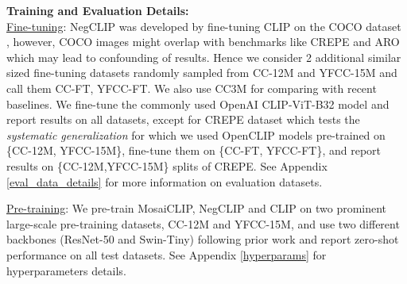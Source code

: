 \documentclass[11pt]{article}
\newcommand{\methodcomp}{MosaiCLIP}
\newcommand{\clip}{CLIP}
\newcommand{\negclip}{NegCLIP}
\begin{document}
\begin{table*}[h!]
      \caption{Pre-training results on all compositionality benchmarks (4 benchmarks, 10 datasets) over four expt. settings (two pre-training datasets, two backbones). See Table \ref{clip_fine-tune_all} for abbreviations and Sec. \ref{results} for more details.}
      \label{pre-training_results_all}
\end{table*}
  
\noindent \textbf{Training and Evaluation Details:} \\
\noindent \underline{Fine-tuning}: NegCLIP \cite{yuksekgonul2022and} was developed by fine-tuning CLIP on the COCO dataset \citep{lin2014microsoft}, however, COCO images might overlap with benchmarks like CREPE and ARO which may lead to confounding of results. Hence we consider 2 additional similar sized fine-tuning datasets randomly sampled from CC-12M \citep{sharma-etal-2018-conceptual, changpinyo2021cc12m} and YFCC-15M \citep{thomee2016yfcc100m} and call them CC-FT, YFCC-FT. We also use CC3M \citep{sharma-etal-2018-conceptual} for comparing with recent baselines. We fine-tune the commonly used OpenAI CLIP-ViT-B32 model and report results on all datasets, except for CREPE dataset which tests the \textit{systematic generalization} for which we used OpenCLIP \cite{Ilharco_OpenCLIP_2021} models pre-trained on \{CC-12M, YFCC-15M\}, fine-tune them on \{CC-FT, YFCC-FT\}, and report results on \{CC-12M,YFCC-15M\} splits of CREPE. See Appendix \ref{eval_data_details} for more information on evaluation datasets.

\noindent \underline{Pre-training}: We pre-train \methodcomp{}, \negclip{} and \clip{} on two prominent large-scale pre-training datasets, CC-12M and YFCC-15M, and use two different backbones (ResNet-50 and Swin-Tiny) following prior work \citep{yang2022unified} and report zero-shot performance on all test datasets. See Appendix \ref{hyperparams} for hyperparameters details.

  
\end{document}
